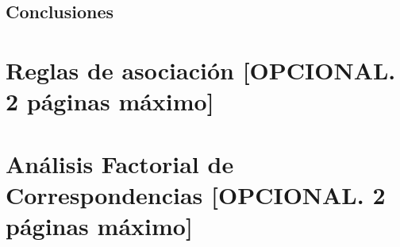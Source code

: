 \documentclass[
]{article}
\begin{document}
\subsection{Conclusiones}\label{conclusiones}

\section{Reglas de asociación {[}OPCIONAL. 2 páginas
máximo{]}}\label{reglas-de-asociaciuxf3n-opcional.-2-puxe1ginas-muxe1ximo}

\section{Análisis Factorial de Correspondencias {[}OPCIONAL. 2 páginas
máximo{]}}\label{anuxe1lisis-factorial-de-correspondencias-opcional.-2-puxe1ginas-muxe1ximo}
\end{document}
